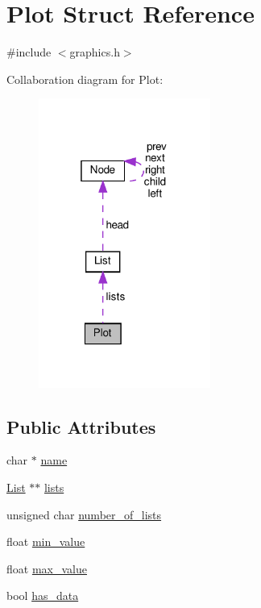 \hypertarget{structPlot}{}\section{Plot Struct Reference}
\label{structPlot}


{\ttfamily \#include $<$graphics.\+h$>$}



Collaboration diagram for Plot\+:\nopagebreak
\begin{figure}[H]
\begin{center}
\leavevmode
\includegraphics[width=160pt]{structPlot__coll__graph}
\end{center}
\end{figure}
\subsection*{Public Attributes}
\begin{DoxyCompactItemize}
\item 
char $\ast$ \hyperlink{structPlot_aa4c1f8e3360f2c41e22e041e1deba9b3}{name}
\item 
\hyperlink{structList}{List} $\ast$$\ast$ \hyperlink{structPlot_acf1191deb7d04e69106419aa87d3729d}{lists}
\item 
unsigned char \hyperlink{structPlot_ae7098880dbd6c20d2a1447fafea20e7b}{number\+\_\+of\+\_\+lists}
\item 
float \hyperlink{structPlot_a2fdd041a89c93f3b540ce57a59bce41c}{min\+\_\+value}
\item 
float \hyperlink{structPlot_ad174b1c447b62ea0e4a49fd3e324ddf0}{max\+\_\+value}
\item 
bool \hyperlink{structPlot_ab710f00d48f56ceb2c8d9345e6334e45}{has\+\_\+data}
\end{DoxyCompactItemize}


